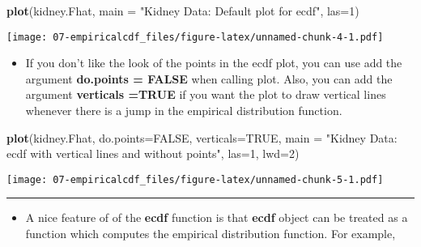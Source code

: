 \documentclass[]{book}
\newenvironment{Shaded}{\begin{snugshade}}{\end{snugshade}}
\newcommand{\DataTypeTok}[1]{\textcolor[rgb]{0.13,0.29,0.53}{#1}}
\newcommand{\DecValTok}[1]{\textcolor[rgb]{0.00,0.00,0.81}{#1}}
\newcommand{\KeywordTok}[1]{\textcolor[rgb]{0.13,0.29,0.53}{\textbf{#1}}}
\newcommand{\NormalTok}[1]{#1}
\newcommand{\OperatorTok}[1]{\textcolor[rgb]{0.81,0.36,0.00}{\textbf{#1}}}
\newcommand{\OtherTok}[1]{\textcolor[rgb]{0.56,0.35,0.01}{#1}}
\newcommand{\StringTok}[1]{\textcolor[rgb]{0.31,0.60,0.02}{#1}}
\providecommand{\tightlist}{%
  \setlength{\itemsep}{0pt}\setlength{\parskip}{0pt}}
\begin{document}
\begin{Shaded}
\begin{Highlighting}[]
\KeywordTok{plot}\NormalTok{(kidney.Fhat, }\DataTypeTok{main =} \StringTok{"Kidney Data: Default plot for ecdf"}\NormalTok{, }\DataTypeTok{las=}\DecValTok{1}\NormalTok{)}
\end{Highlighting}
\end{Shaded}

\texttt{[image: 07-empiricalcdf\_files/figure-latex/unnamed-chunk-4-1.pdf]}

\begin{itemize}
\tightlist
\item
  If you don't like the look of the points in the ecdf plot, you can use add the argument
  \textbf{do.points = FALSE} when calling plot. Also, you can add the argument \textbf{verticals =TRUE}
  if you want the plot to draw vertical lines whenever there is a jump in the empirical distribution function.
\end{itemize}

\begin{Shaded}
\begin{Highlighting}[]
\KeywordTok{plot}\NormalTok{(kidney.Fhat, }\DataTypeTok{do.points=}\OtherTok{FALSE}\NormalTok{, }\DataTypeTok{verticals=}\OtherTok{TRUE}\NormalTok{, }\DataTypeTok{main =} \StringTok{"Kidney Data: }
\StringTok{    ecdf with vertical lines and without points"}\NormalTok{, }\DataTypeTok{las=}\DecValTok{1}\NormalTok{, }\DataTypeTok{lwd=}\DecValTok{2}\NormalTok{)}
\end{Highlighting}
\end{Shaded}

\texttt{[image: 07-empiricalcdf\_files/figure-latex/unnamed-chunk-5-1.pdf]}

\begin{center}\rule{0.5\linewidth}{\linethickness}\end{center}

\begin{itemize}
\tightlist
\item
  A nice feature of of the \textbf{ecdf} function is that \textbf{ecdf} object
  can be treated as a function which computes the empirical distribution function.
  For example,
\end{itemize}

\begin{Shaded}
\end{Shaded}
\end{document}
